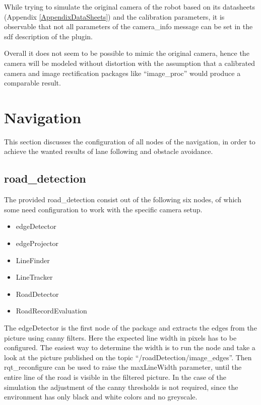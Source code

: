 While trying to simulate the original camera of the robot based on its datasheets (Appendix \ref{AppendixDataSheets}) and the calibration parameters, it is observable that not all parameters of the camera\_info message can be set in the sdf description of the plugin.

Overall it does not seem to be possible to mimic the original camera, hence the camera will be modeled without distortion with the assumption that a calibrated camera and image rectification packages like ``image\_proc'' would produce a comparable result.




\section{Navigation}
This section discusses the configuration of all nodes of the navigation, in order to achieve the wanted results of lane following and obstacle avoidance.

\subsection{road\_detection}
The provided road\_detection consist out of the following six nodes, of which some need configuration to work with the specific camera setup.

\begin{itemize}
	\item edgeDetector
	\item edgeProjector
	\item LineFinder
	\item LineTracker
	\item RoadDetector
	\item RoadRecordEvaluation
\end{itemize}

The edgeDetector is the first node of the package and extracts the edges from the picture using canny filters. Here the expected line width in pixels has to be configured. The easiest way to determine the width is to run the node and take a look at the picture published on the topic ``/roadDetection/image\_edges''. Then rqt\_reconfigure can be used to raise the maxLineWidth parameter, until the entire line of the road is visible in the filtered picture. In the case of the simulation the adjustment of the canny thresholds is not required, since the environment has only black and white colors and no greyscale.\\

